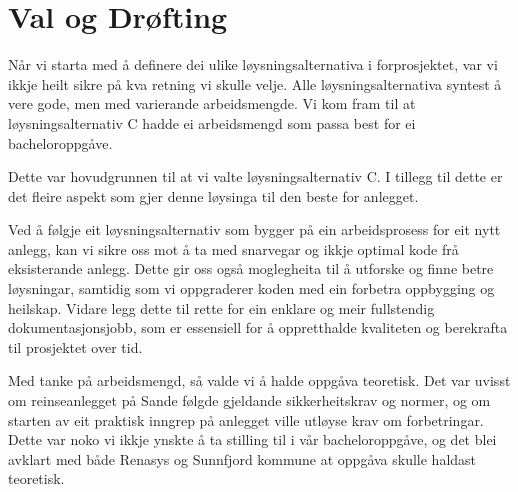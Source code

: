 \section{Val og Drøfting}

Når vi starta med å definere dei ulike løysningsalternativa i forprosjektet, var vi
ikkje heilt sikre på kva retning vi skulle velje. Alle løysningsalternativa syntest å vere gode,
men med varierande arbeidsmengde. Vi kom fram til at løysningsalternativ C hadde ei arbeidsmengd
som passa best for ei bacheloroppgåve.

Dette var hovudgrunnen til at vi valte løysningsalternativ C.
I tillegg til dette er det fleire aspekt som gjer denne løysinga til den beste for anlegget.

Ved å følgje eit løysningsalternativ som bygger på ein arbeidsprosess for eit nytt anlegg, 
kan vi sikre oss mot å ta med snarvegar og ikkje optimal kode frå eksisterande anlegg. 
Dette gir oss også moglegheita til å utforske og finne betre løysningar, 
samtidig som vi oppgraderer koden med ein forbetra oppbygging og heilskap.
Vidare legg dette til rette for ein enklare og meir fullstendig dokumentasjonsjobb, 
som er essensiell for å oppretthalde kvaliteten og berekrafta til prosjektet over tid.

Med tanke på arbeidsmengd, så valde vi å halde oppgåva teoretisk.
Det var uvisst om reinseanlegget på Sande følgde gjeldande sikkerheitskrav og normer,
og om starten av eit praktisk inngrep på anlegget ville utløyse krav om forbetringar.
Dette var noko vi ikkje ynskte å ta stilling til i vår bacheloroppgåve, og det blei avklart
med både Renasys og Sunnfjord kommune at oppgåva skulle haldast teoretisk.

